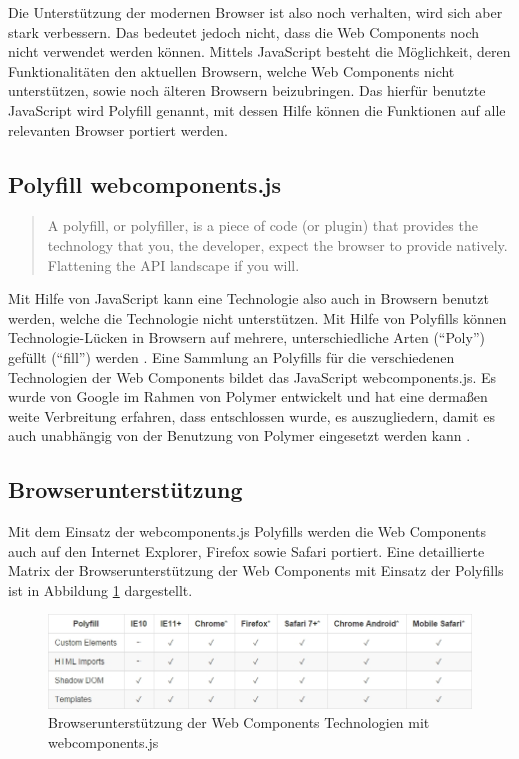 Die Unterstützung der modernen Browser ist also noch verhalten, wird sich aber stark verbessern. Das bedeutet jedoch nicht, dass die Web Components noch nicht verwendet werden können. Mittels JavaScript besteht die Möglichkeit, deren Funktionalitäten den aktuellen Browsern, welche Web Components nicht unterstützen, sowie noch älteren Browsern beizubringen. Das hierfür benutzte JavaScript wird Polyfill genannt, mit dessen Hilfe können die Funktionen auf alle relevanten Browser portiert werden.


\subsection{Polyfill webcomponents.js}\label{polyfill-webcomponents.js}

\begin{quote}
A polyfill, or polyfiller, is a piece of code (or plugin) that provides the technology that you, the developer, expect the browser to provide natively. Flattening the \ac{API} landscape if you will. \cite{citeulike:13914241}
\end{quote}

Mit Hilfe von JavaScript kann eine Technologie also auch in Browsern benutzt werden, welche die Technologie nicht unterstützen. Mit Hilfe von Polyfills können Technologie-Lücken in Browsern auf mehrere, unterschiedliche Arten (``Poly'') gefüllt (``fill'') werden \cite{citeulike:13914234}. Eine Sammlung an Polyfills für die verschiedenen Technologien der Web Components bildet das JavaScript webcomponents.js. Es wurde von Google im Rahmen von Polymer entwickelt und hat eine dermaßen weite Verbreitung erfahren, dass entschlossen wurde, es auszugliedern, damit es auch unabhängig von der Benutzung von Polymer eingesetzt werden kann \cite{citeulike:13914239}.


\subsection{Browserunterstützung}\label{polyfills-browserunterstuetzung}

Mit dem Einsatz der webcomponents.js Polyfills werden die Web Components auch auf den Internet Explorer, Firefox sowie Safari portiert. Eine detaillierte Matrix der Browserunterstützung der Web Components mit Einsatz der Polyfills ist in Abbildung \ref{fig:bdwctmwcjs} \cite{citeulike:13914238} dargestellt.

\begin{figure}[htbp]
 \centering
 \includegraphics[width=\linewidth]{kapitel2/bilder/6-webcomponentsjs-browserunterstuetzung}
 \caption{Browserunterstützung der Web Components Technologien mit webcomponents.js}
 \label{fig:bdwctmwcjs}
\end{figure}

